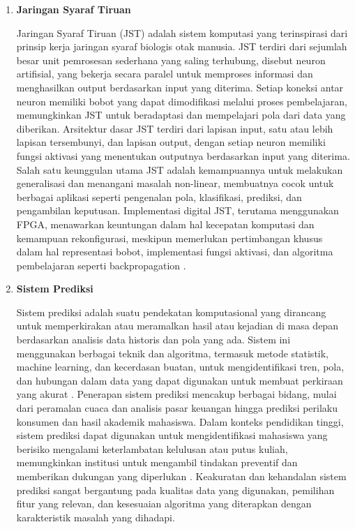 \begin{enumerate}
    \item \textbf{Jaringan Syaraf Tiruan}
    
    Jaringan Syaraf Tiruan (JST) adalah sistem komputasi yang terinspirasi dari prinsip kerja jaringan syaraf biologis otak manusia. JST terdiri dari sejumlah besar unit pemrosesan sederhana yang saling terhubung, disebut neuron artifisial, yang bekerja secara paralel untuk memproses informasi dan menghasilkan output berdasarkan input yang diterima. Setiap koneksi antar neuron memiliki bobot yang dapat dimodifikasi melalui proses pembelajaran, memungkinkan JST untuk beradaptasi dan mempelajari pola dari data yang diberikan. Arsitektur dasar JST terdiri dari lapisan input, satu atau lebih lapisan tersembunyi, dan lapisan output, dengan setiap neuron memiliki fungsi aktivasi yang menentukan outputnya berdasarkan input yang diterima. Salah satu keunggulan utama JST adalah kemampuannya untuk melakukan generalisasi dan menangani masalah non-linear, membuatnya cocok untuk berbagai aplikasi seperti pengenalan pola, klasifikasi, prediksi, dan pengambilan keputusan. Implementasi digital JST, terutama menggunakan FPGA, menawarkan keuntungan dalam hal kecepatan komputasi dan kemampuan rekonfigurasi, meskipun memerlukan pertimbangan khusus dalam hal representasi bobot, implementasi fungsi aktivasi, dan algoritma pembelajaran seperti backpropagation \cite{amrutha2018performance}.

    \item \textbf{Sistem Prediksi}
    
    Sistem prediksi adalah suatu pendekatan komputasional yang dirancang untuk memperkirakan atau meramalkan hasil atau kejadian di masa depan berdasarkan analisis data historis dan pola yang ada. Sistem ini menggunakan berbagai teknik dan algoritma, termasuk metode statistik, machine learning, dan kecerdasan buatan, untuk mengidentifikasi tren, pola, dan hubungan dalam data yang dapat digunakan untuk membuat perkiraan yang akurat \cite{dengen2018student}. Penerapan sistem prediksi mencakup berbagai bidang, mulai dari peramalan cuaca dan analisis pasar keuangan hingga prediksi perilaku konsumen dan hasil akademik mahasiswa. Dalam konteks pendidikan tinggi, sistem prediksi dapat digunakan untuk mengidentifikasi mahasiswa yang berisiko mengalami keterlambatan kelulusan atau putus kuliah, memungkinkan institusi untuk mengambil tindakan preventif dan memberikan dukungan yang diperlukan \cite{wirawan2019application}. Keakuratan dan kehandalan sistem prediksi sangat bergantung pada kualitas data yang digunakan, pemilihan fitur yang relevan, dan kesesuaian algoritma yang diterapkan dengan karakteristik masalah yang dihadapi.
\end{enumerate}

